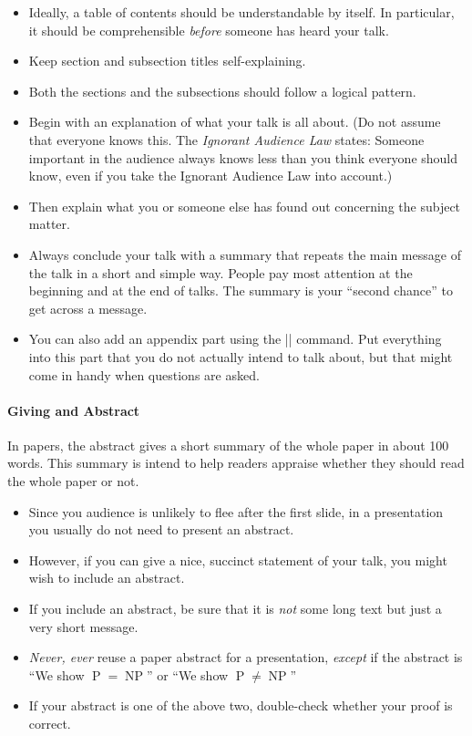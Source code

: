 \begin{itemize}
\item
  Ideally, a table of contents should be understandable by itself. In
  particular, it should be comprehensible \emph{before} someone has
  heard your talk.
\item
  Keep section and subsection titles self-explaining.
\item   
  Both the sections and the subsections should follow a logical
  pattern.
\item
  Begin with an explanation of what your talk is all about. (Do
  not assume that everyone knows this. The \emph{Ignorant Audience
  Law} states: Someone important in the audience always knows less
  than you think everyone should know, even if you take the Ignorant
  Audience Law into account.) 
\item
  Then explain what you or someone else has found out concerning the
  subject matter.
\item
  Always conclude your talk with a summary that repeats the main
  message of the talk in a short and simple way. People pay most
  attention at the beginning and at the end of talks. The summary is
  your ``second chance'' to get across a message.
\item
  You can also add an appendix part using the |\appendix| command. Put
  everything into this part that you do not actually intend to talk
  about, but that might come in handy when questions are asked.
\end{itemize}



\paragraph{Giving and Abstract}

In papers, the abstract gives a short summary of the whole paper in
about 100 words. This summary is intend to help readers appraise
whether they should read the whole paper or not.
\begin{itemize}
\item
  Since you audience is unlikely to flee after the first slide, in
  a presentation you usually do not need to present an abstract.
\item
  However, if you can give a nice, succinct statement of your
  talk, you might wish to include an abstract.
\item  
  If you include an abstract, be sure that it is \emph{not} some long 
  text but just a very short message.
\item
  \emph{Never, ever} reuse a paper abstract for a presentation,
  \emph{except} if the abstract is ``We show $\operatorname{P} =
  \operatorname{NP}$'' or ``We show $\operatorname{P} \neq
  \operatorname{NP}$''
\item
  If your abstract is one of the above two, double-check whether
  your proof is correct.
\end{itemize}





